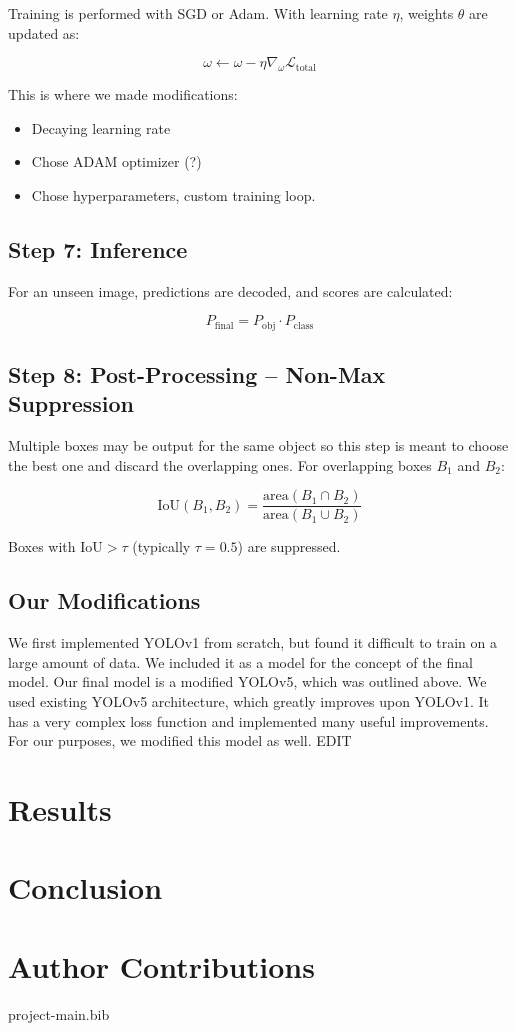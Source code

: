 \documentclass[11pt]{article}
\begin{document}
Training is performed with SGD or Adam. With learning rate $\eta$, weights $\theta$ are updated as:

\[
\omega \leftarrow \omega - \eta \nabla_\omega \mathcal{L}_{\text{total}}
\]\cite{loshchilov2017sgdr}

This is where we made modifications:
\begin{itemize}
    \item Decaying learning rate
    \item Chose ADAM optimizer (?)
    \item Chose hyperparameters, custom training loop.
\end{itemize} 

\subsection{Step 7: Inference}

For an unseen image, predictions are decoded, and scores are calculated:

\[
P_{\text{final}} = P_{\text{obj}} \cdot P_{\text{class}}
\] \cite{glenn2020yolov5}

\subsection{Step 8: Post-Processing – Non-Max Suppression}

Multiple boxes may be output for the same object so this step is meant to choose the best one and discard the overlapping ones. For overlapping boxes $B_1$ and $B_2$:

\[
\text{IoU}(B_1, B_2) = \frac{\text{area}(B_1 \cap B_2)}{\text{area}(B_1 \cup B_2)}
\] \cite{hosang2017learningnms}

Boxes with $\text{IoU} > \tau$ (typically $\tau = 0.5$) are suppressed.
\subsection{Our Modifications}
    We first implemented YOLOv1 from scratch, but found it difficult to train on a large amount of data. We included it as a model for the concept of the final model. Our final model is a modified YOLOv5, which was outlined above. We used existing YOLOv5 architecture, which greatly improves upon YOLOv1. It has a very complex loss function and implemented many useful improvements. For our purposes, we modified this model as well. EDIT
\section{Results}
\blindtext %
\section{Conclusion}
\blindtext %
\section{Author Contributions}
\blindtext %
 {project-main.bib}

\end{document}
